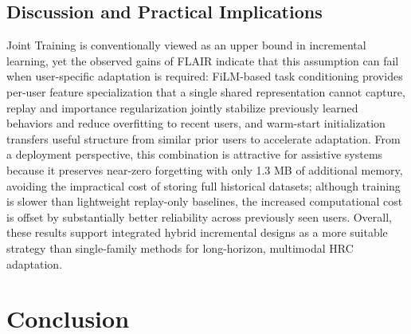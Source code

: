 \documentclass[3p,times,procedia]{elsarticle}
\begin{document}
\subsection{Discussion and Practical Implications}

Joint Training is conventionally viewed as an upper bound in incremental learning, yet the observed gains of FLAIR indicate that this assumption can fail when user-specific adaptation is required: FiLM-based task conditioning provides per-user feature specialization that a single shared representation cannot capture, replay and importance regularization jointly stabilize previously learned behaviors and reduce overfitting to recent users, and warm-start initialization transfers useful structure from similar prior users to accelerate adaptation. From a deployment perspective, this combination is attractive for assistive systems because it preserves near-zero forgetting with only 1.3 MB of additional memory, avoiding the impractical cost of storing full historical datasets; although training is slower than lightweight replay-only baselines, the increased computational cost is offset by substantially better reliability across previously seen users. Overall, these results support integrated hybrid incremental designs as a more suitable strategy than single-family methods for long-horizon, multimodal HRC adaptation.





\section{Conclusion}
\end{document}
